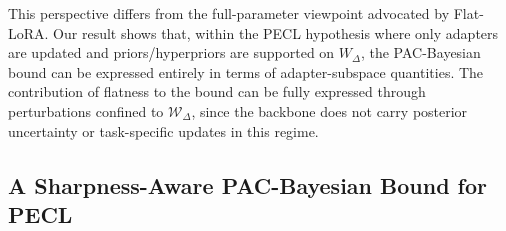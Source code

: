 \documentclass[10pt]{article} %
\begin{document}
This perspective differs from the full-parameter viewpoint advocated by Flat-LoRA. Our result shows that, within the PECL hypothesis where only adapters are updated and priors/hyperpriors are supported on $W_\Delta$, the PAC-Bayesian bound can be expressed entirely in terms of adapter-subspace quantities.
The contribution of flatness to the bound can be fully expressed through perturbations confined to $\mathcal{W}_{\Delta}$, since the backbone does not carry posterior uncertainty or task-specific updates in this regime.





\subsection{A Sharpness-Aware PAC-Bayesian Bound for PECL}
\end{document}
